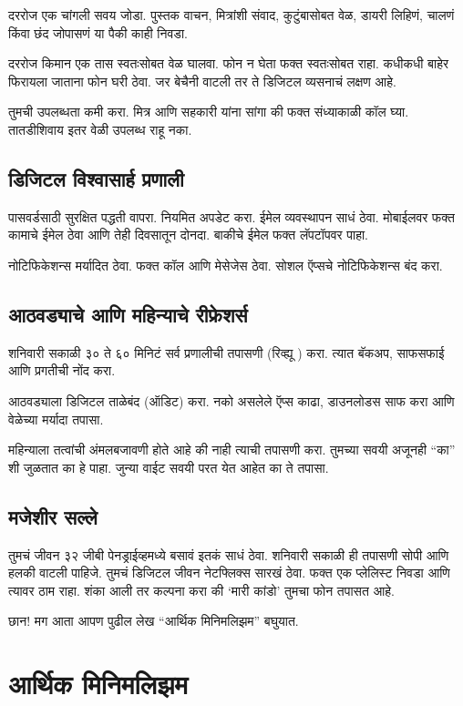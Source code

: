 दररोज एक चांगली सवय जोडा. पुस्तक वाचन, मित्रांशी संवाद, कुटुंबासोबत वेळ, डायरी लिहिणं, चालणं किंवा छंद जोपासणं या पैकी काही निवडा.

दररोज किमान एक तास स्वतःसोबत वेळ घालवा. फोन न घेता फक्त स्वतःसोबत राहा. कधीकधी बाहेर फिरायला जाताना फोन घरी ठेवा. जर बेचैनी वाटली तर ते डिजिटल व्यसनाचं लक्षण आहे.

तुमची उपलब्धता कमी करा. मित्र आणि सहकारी यांना सांगा की फक्त संध्याकाळी कॉल घ्या. तातडीशिवाय इतर वेळी उपलब्ध राहू नका.

\section*{डिजिटल विश्वासार्ह प्रणाली}

पासवर्डसाठी सुरक्षित पद्धती वापरा. नियमित अपडेट करा. ईमेल व्यवस्थापन साधं ठेवा. मोबाईलवर फक्त कामाचे ईमेल ठेवा आणि तेही दिवसातून दोनदा. बाकीचे ईमेल फक्त लॅपटॉपवर पाहा.

नोटिफिकेशन्स मर्यादित ठेवा. फक्त कॉल आणि मेसेजेस ठेवा. सोशल ऍप्सचे नोटिफिकेशन्स बंद करा.

\section*{आठवड्याचे आणि महिन्याचे रीफ्रेशर्स}

शनिवारी सकाळी ३० ते ६० मिनिटं सर्व प्रणालीची तपासणी (रिव्ह्यू ) करा. त्यात बॅकअप, साफसफाई आणि प्रगतीची नोंद करा.

आठवड्याला डिजिटल ताळेबंद (ऑडिट)  करा. नको असलेले ऍप्स काढा, डाउनलोडस साफ करा आणि वेळेच्या मर्यादा तपासा.

महिन्याला तत्वांची अंमलबजावणी होते आहे की नाही त्याची तपासणी करा. तुमच्या सवयी अजूनही “का” शी जुळतात का हे पाहा. जुन्या वाईट सवयी परत येत आहेत का ते तपासा.

\section*{मजेशीर सल्ले}

तुमचं जीवन ३२ जीबी पेनड्राईव्हमध्ये बसावं इतकं साधं ठेवा. शनिवारी सकाळी ही तपासणी सोपी आणि हलकी वाटली पाहिजे. तुमचं डिजिटल जीवन नेटफ्लिक्स सारखं ठेवा. फक्त एक प्लेलिस्ट निवडा आणि त्यावर ठाम राहा.
शंका आली तर कल्पना करा की ‘मारी कांडो’ तुमचा फोन तपासत आहे.

छान! मग आता आपण पुढील लेख “आर्थिक मिनिमलिझम” बघुयात.


\chapter{आर्थिक मिनिमलिझम}

